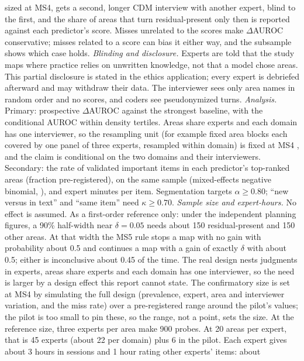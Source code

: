 sized at MS4, gets a second, longer CDM interview with another expert, blind to the first, and the share
of areas that turn residual-present only then is reported against each predictor's score. Misses
unrelated to the scores make $\Delta$AUROC conservative; misses related to a score can bias it either
way, and the subsample shows which case holds.
\emph{Blinding and disclosure.} Experts are told that the study maps where practice relies on
unwritten knowledge, not that a model chose areas. This partial disclosure is stated in the ethics
application; every expert is debriefed afterward and may withdraw their data. The interviewer sees
only area names in random order and no scores, and coders see pseudonymized turns.
\emph{Analysis.} Primary: prospective $\Delta$AUROC against the strongest baseline, with the
conditional AUROC within density tertiles. Areas share experts and each domain has one interviewer, so
the resampling unit (for example fixed area blocks each covered by one panel of three experts,
resampled within domain) is fixed at MS4 \parencite{obuchowski1997nonparametric}, and the claim is
conditional on the two domains and their interviewers. Secondary: the rate of validated important
items in each predictor's top-ranked areas (fraction pre-registered), on the same sample
(mixed-effects negative binomial, \cite{bates2015fitting}), and expert minutes per item.
Segmentation targets $\alpha \geq 0.80$; \enquote{new versus in text} and \enquote{same item} need
$\kappa \geq 0.70$.
\emph{Sample size and expert-hours.} No effect is assumed. As a first-order reference only: under
the independent planning figures, a 90\% half-width near $\delta = 0.05$ needs about 150
residual-present and 150 other areas. At that width the MS5 rule stops a map with no gain with
probability about 0.5 and continues a map with a gain of exactly $\delta$ with about 0.5; either is
inconclusive about 0.45 of the time. The real design nests judgments in experts, areas share experts
and each domain has one interviewer, so the need is larger by a design effect this report cannot state.
The confirmatory size is set at MS4 by simulating the full design (prevalence, expert, area and
interviewer variation, and the miss rate) over a pre-registered range around the pilot's values; the
pilot is too small to pin these, so the range, not a point, sets the size. At the reference size, three
experts per area make 900 probes. At 20 areas per expert, that is 45 experts (about 22 per domain) plus 6 in
the pilot. Each expert gives about 3 hours in sessions and 1 hour rating other experts' items: about
